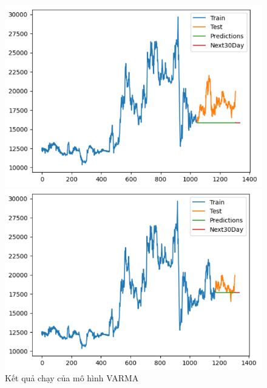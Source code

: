\begin{figure}[H]
\begin{minipage}{0.15\textwidth}
    \includegraphics[width=1\textwidth]{resources/chapter-5/newdata/result/EIB_ARIMA_8-2.png}
    \end{minipage}
    \hfill
        \begin{minipage}{0.15\textwidth}
    \centering
    \includegraphics[width=1\textwidth]{resources/chapter-5/newdata/result/EIB_ARIMA_9-1.png}
    \end{minipage}
    \hfill
    
    \caption{Kết quả chạy của mô hình VARMA}
    \label{fig:arima_result}
\end{figure}

